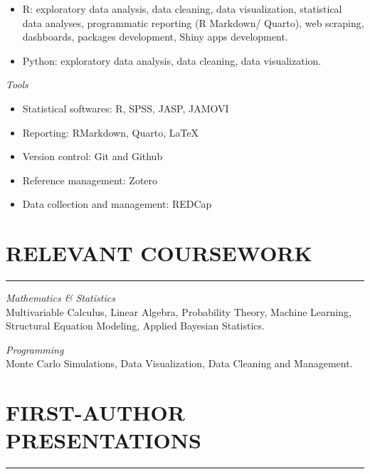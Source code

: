 \documentclass[10pt,]{article}
\providecommand{\tightlist}{%
  \setlength{\itemsep}{0pt}\setlength{\parskip}{0pt}}
\begin{document}
\begin{itemize}
\tightlist
\item
  R: exploratory data analysis, data cleaning, data visualization,
  statistical data analyses, programmatic reporting (R Markdown/
  Quarto), web scraping, dashboards, packages development, Shiny apps
  development.
\item
  Python: exploratory data analysis, data cleaning, data visualization.
\end{itemize}

\emph{Tools}

\begin{itemize}
\tightlist
\item
  Statistical softwares: R, SPSS, JASP, JAMOVI
\item
  Reporting: RMarkdown, Quarto, \LaTeX
\item
  Version control: Git and Github
\item
  Reference management: Zotero
\item
  Data collection and management: REDCap
\end{itemize}

\section{RELEVANT COURSEWORK}\label{relevant-coursework}

\hrule

\emph{Mathematics \& Statistics}\\
Multivariable Calculus, Linear Algebra, Probability Theory, Machine
Learning, Structural Equation Modeling, Applied Bayesian Statistics.

\emph{Programming}\\
Monte Carlo Simulations, Data Visualization, Data Cleaning and
Management.

\section{FIRST-AUTHOR PRESENTATIONS}\label{first-author-presentations}

\hrule
\end{document}
